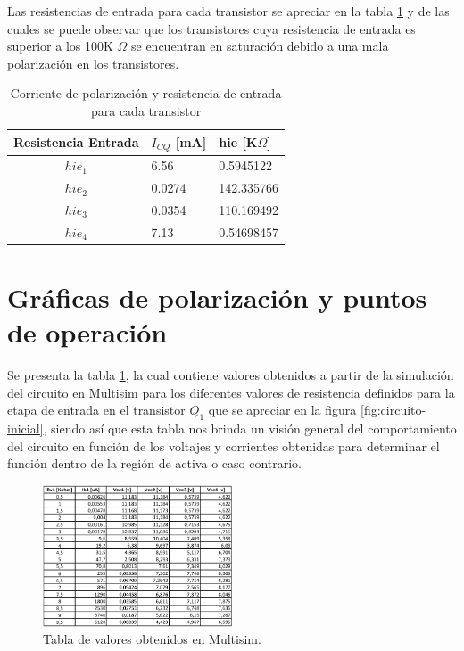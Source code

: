 \documentclass[conference]{IEEEtran}
\begin{document}
    
    Las resistencias de entrada para cada transistor se apreciar en la tabla \ref{tb:hie-bjt} y de las cuales se puede observar que los transistores cuya resistencia de entrada es superior a los 100K $\Omega$ se encuentran en saturación debido a una mala polarización en los transistores.

    \begin{table}[]
        \begin{tabular}{|c|l|l|}
            \hline
            \textbf{Resistencia Entrada} & \multicolumn{1}{c|}{\textbf{$I_{CQ}$ {[}mA{]}}} & \textbf{hie {[}K$\Omega${]}} \\ \hline
            $hie_1$                        & 6.56                                       & 0.5945122            \\ \hline
            $hie_2$                        & 0.0274                                     & 142.335766           \\ \hline
            $hie_3$                        & 0.0354                                     & 110.169492           \\ \hline
            $hie_4$                        & 7.13                                       & 0.54698457           \\ \hline
        \end{tabular}
        \caption{Corriente de polarización y resistencia de entrada para cada transistor}
        \label{tb:hie-bjt}
    \end{table}
    
\section{Gráficas de polarización y puntos de operación}

    Se presenta la tabla \ref{fig:tabla-resumen-valores}, la cual contiene valores obtenidos a partir de la simulación del circuito en Multisim para los diferentes valores de resistencia definidos para la etapa de entrada en el transistor $Q_1$ que se apreciar en la figura \ref{fig:circuito-inicial}, siendo así que esta tabla nos brinda un visión general del comportamiento del circuito en función de los voltajes y corrientes obtenidas para determinar el función dentro de la región de activa o caso contrario.
    
    \begin{figure}[h]
        \centering
        \includegraphics[width=0.5\textwidth]{media/IMAGENES MATLAB/TABLA1.png}
        \caption{Tabla de valores obtenidos en Multisim.}
        \label{fig:tabla-resumen-valores}
    \end{figure}
\end{document}
